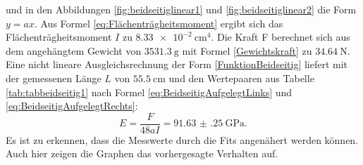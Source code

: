 und in den Abbildungen \ref{fig:beidseitiglinear1} und \ref{fig:beidseitiglinear2} die Form $y=a x$. Aus Formel \eqref{eq:Flächenträgheitsmoment} ergibt sich das Flächenträgheitsmoment $I$ zu $\SI{8.33e-2}{\centi\meter\tothe{4}}$.  Die Kraft F berechnet sich aus dem angehängtem Gewicht von $\SI{3531.3}{\gram}$ mit Formel \eqref{Gewichtskraft} zu $\SI{34.64}{\newton}$. Eine nicht lineare Ausgleichsrechnung der Form \eqref{FunktionBeidseitig} liefert mit der gemessenen Länge $L$ von $\SI{55.5}{\centi\meter}$ und den Wertepaaren aus Tabelle \ref{tab:tabbeidseitig1} nach Formel \eqref{eq:BeidseitigAufgelegtLinks} und \eqref{eq:BeidseitigAufgelegtRechts}:
\begin{displaymath}
E = \frac{F}{48 a I}= \SI{91.63(25)}{\giga\pascal}\text{.}
\end{displaymath}
Es ist zu erkennen, dass die Messwerte durch die Fits angenähert werden können. Auch hier zeigen die Graphen das vorhergesagte Verhalten auf.

